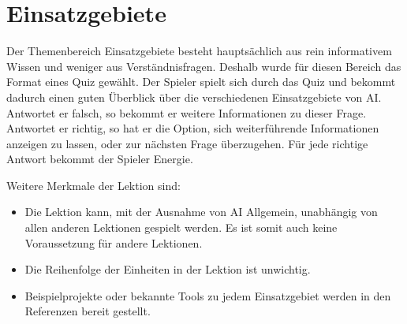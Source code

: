 \section{Einsatzgebiete}
\label{lm_einsatzgebiete}

Der Themenbereich \glqq Einsatzgebiete\grqq{} besteht hauptsächlich aus rein informativem Wissen und weniger aus Verständnisfragen. Deshalb wurde für diesen Bereich das Format eines Quiz gewählt. Der Spieler spielt sich durch das Quiz und bekommt dadurch einen guten  Überblick über die verschiedenen Einsatzgebiete von AI. Antwortet er falsch, so bekommt er weitere Informationen zu dieser Frage. Antwortet er richtig, so hat er die Option, sich weiterführende Informationen anzeigen zu lassen, oder zur nächsten Frage überzugehen. Für jede richtige Antwort bekommt der Spieler Energie.
 
Weitere Merkmale der Lektion sind:
\begin{itemize}
\item Die Lektion kann, mit der Ausnahme von AI Allgemein, unabhängig von allen anderen Lektionen gespielt werden. Es ist somit auch keine Voraussetzung für andere Lektionen.
\item Die Reihenfolge der Einheiten in der Lektion ist unwichtig.
\item Beispielprojekte oder bekannte Tools zu jedem Einsatzgebiet werden in den Referenzen bereit gestellt.
\end{itemize}